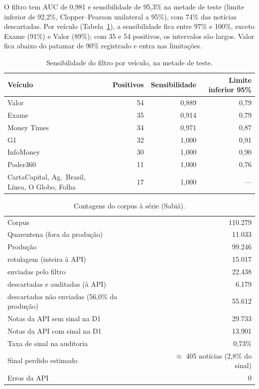 \documentclass[11pt,a4paper]{article}
\begin{document}
\noindent O filtro tem AUC de 0,981 e sensibilidade de 95,3\% na metade de
teste (limite inferior de 92,2\%, Clopper--Pearson unilateral a 95\%), com 74\%
das notícias descartadas. Por veículo (Tabela~\ref{tab:sens}), a sensibilidade
fica entre 97\% e 100\%, exceto Exame (91\%) e Valor (89\%); com 35 e 54
positivos, os intervalos são largos. Valor fica abaixo do patamar de 90\%
registrado e entra nas limitações.

\begin{table}[H]
\centering\small
\caption{Sensibilidade do filtro por veículo, na metade de teste.}\label{tab:sens}
\begin{tabular}{@{}lrrr@{}}
\toprule
Veículo & Positivos & Sensibilidade & Limite inferior 95\% \\
\midrule
Valor & 54 & 0,889 & 0,79 \\
Exame & 35 & 0,914 & 0,79 \\
Money Times & 34 & 0,971 & 0,87 \\
G1 & 32 & 1,000 & 0,91 \\
InfoMoney & 30 & 1,000 & 0,90 \\
Poder360 & 11 & 1,000 & 0,76 \\
CartaCapital, Ag.\ Brasil, Línea, O Globo, Folha & 17 & 1,000 & --- \\
\bottomrule
\end{tabular}
\end{table}

\begin{table}[H]
\centering\small
\caption{Contagens do corpus à série (Sabiá).}\label{tab:contagens}
\begin{tabular}{@{}lr@{}}
\toprule
Corpus & 110.279 \\
Quarentena (fora da produção) & 11.033 \\
Produção & 99.246 \\
\quad rotulagem (inteira à API) & 15.017 \\
\quad enviadas pelo filtro & 22.438 \\
\quad descartadas e auditadas (à API) & 6.179 \\
\quad descartadas não enviadas (56,0\% da produção) & 55.612 \\
Notas da API sem sinal na D1 & 29.733 \\
Notas da API com sinal na D1 & 13.901 \\
Taxa de sinal na auditoria & 0,73\% \\
Sinal perdido estimado & $\approx$ 405 notícias (2,8\% do sinal) \\
Erros da API & 0 \\
\bottomrule
\end{tabular}
\end{table}
\end{document}
